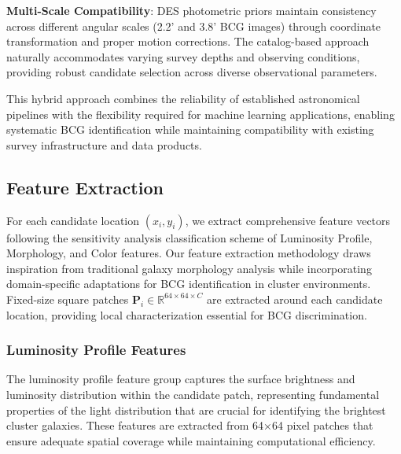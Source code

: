 \documentclass[twocolumn,10pt]{aastex631}
\begin{document}
\textbf{Multi-Scale Compatibility}: DES photometric priors maintain consistency across different angular scales (2.2' and 3.8' BCG images) through coordinate transformation and proper motion corrections. The catalog-based approach naturally accommodates varying survey depths and observing conditions, providing robust candidate selection across diverse observational parameters.

This hybrid approach combines the reliability of established astronomical pipelines with the flexibility required for machine learning applications, enabling systematic BCG identification while maintaining compatibility with existing survey infrastructure and data products.

\subsection{Feature Extraction}

For each candidate location $(x_i, y_i)$, we extract comprehensive feature vectors following the sensitivity analysis classification scheme of Luminosity Profile, Morphology, and Color features. Our feature extraction methodology draws inspiration from traditional galaxy morphology analysis \citep{Conselice2003} while incorporating domain-specific adaptations for BCG identification in cluster environments. Fixed-size square patches $\mathbf{P}_i \in \mathbb{R}^{64 \times 64 \times C}$ are extracted around each candidate location, providing local characterization essential for BCG discrimination.

\subsubsection{Luminosity Profile Features}

The luminosity profile feature group captures the surface brightness and luminosity distribution within the candidate patch, representing fundamental properties of the light distribution that are crucial for identifying the brightest cluster galaxies. These features are extracted from 64×64 pixel patches that ensure adequate spatial coverage while maintaining computational efficiency.
\end{document}
